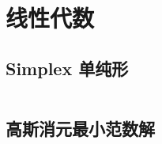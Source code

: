 \section{线性代数}
				\subsection{Simplex 单纯形}
					\inputminted{cpp}{src/Math/Simplex.cpp}
				\subsection{高斯消元最小范数解}
					\inputminted{cpp}{src/Geometry/minnorm_gauss.cpp}
